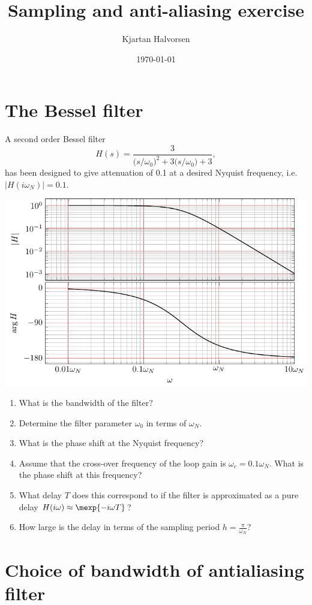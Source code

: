 \documentclass[letterpaper]{scrartcl}
\author{Kjartan Halvorsen}
\date{\today}
\title{Sampling and anti-aliasing exercise}
\begin{document}
\maketitle

\section*{The Bessel filter}
\label{sec-1}
  A second order Bessel filter
\[ H(s) = \frac{3}{\big(s/\omega_0\big)^2 + 3\big(s/\omega_0\big) + 3}, \]
has been designed to give attenuation of 0.1 at a desired Nyquist frequency, i.e. \(|H(i\omega_N)| = 0.1\).

\begin{center}
\includegraphics[width=0.8\linewidth]{../figures/ps7-bessel-bode}
\end{center}

\begin{enumerate}
\item What is the bandwidth of the filter?
\item Determine the filter parameter \(\omega_0\) in terms of \(\omega_N\).
\item What is the phase shift at the Nyquist frequency?
\item Assume that the cross-over frequency of the loop gain is \(\omega_c = 0.1\omega_N\). What is the phase shift at this frequency?
\item What delay $T$  does this correspond to if the filter is approximated as a pure delay \(H(i\omega) \approx \mexp{-i\omega T}\)?
\item How large is the delay in terms of the sampling period \(h = \frac{\pi}{\omega_N}\)?
\end{enumerate}


\section*{Choice of bandwidth of antialiasing filter}
\label{sec-2}
\end{document}
